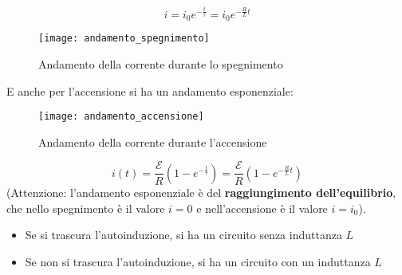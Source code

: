 \documentclass[a4paper]{article}
\begin{document}
\[
  i = i_0 e^{-\frac{t}{\tau}} = i_0 e^{-\frac{R}{L} t}
\] 
\begin{figure}[H]
  \centering
  \texttt{[image: andamento\_spegnimento]}
  \caption{Andamento della corrente durante lo spegnimento}
\end{figure}
E anche per l'accensione si ha un andamento esponenziale:
\begin{figure}[H]
  \centering
  \texttt{[image: andamento\_accensione]}
  \caption{Andamento della corrente durante l'accensione}
\end{figure}
\[
  i(t) = \frac{\mathcal{E}}{R} \left( 1 - e^{-\frac{t}{\tau}} \right) = \frac{\mathcal{E}}{R} \left( 1 - e^{-\frac{R}{L} t} \right)
\] 
(Attenzione: l'andamento esponenziale è del \textbf{raggiungimento dell'equilibrio}, che
nello spegnimento è il valore \( i = 0 \) e nell'accensione è il valore \( i = i_0 \)).
\begin{itemize}
  \item Se si trascura l'autoinduzione, si ha un circuito senza induttanza \( L \)
  \item Se non si trascura l'autoinduzione, si ha un circuito con un induttanza \( L \) 
\end{itemize}
\end{document}
